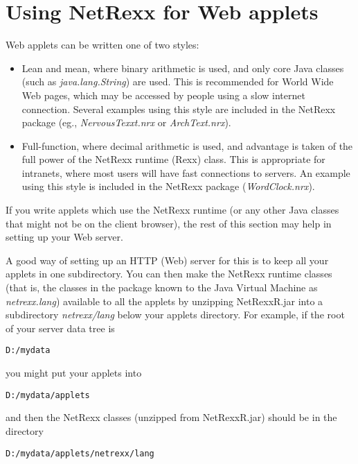 \chapter{Using NetRexx for Web applets}

Web applets can be written one of two styles:
\begin{itemize}
\item Lean and mean, where binary arithmetic is used, and only core
Java classes (such as \emph{java.lang.String}) are used.  This is
recommended for World Wide Web pages, which may be accessed by people
using a slow internet connection.
Several examples using this style are included in the NetRexx package
(eg., \emph{NervousTexxt.nrx} or \emph{ArchText.nrx}).
\item Full-function, where decimal arithmetic is used, and advantage is
taken of the full power of the NetRexx runtime (Rexx) class.
This is appropriate for intranets, where most users will have fast
connections to servers.
An example using this style is included in the NetRexx package
(\emph{WordClock.nrx}).
\end{itemize}
If you write applets which use the NetRexx runtime (or any other Java
classes that might not be on the client browser), the rest of this
section may help in setting up your Web server.

A good way of setting up an HTTP (Web) server for this is to keep all
your applets in one subdirectory.  You can then make the NetRexx runtime
classes (that is, the classes in the package known to the Java Virtual
Machine as \emph{netrexx.lang}) available to all the applets by
unzipping NetRexxR.jar into a subdirectory \emph{netrexx/lang} below
your applets directory.
\newline
For example, if the root of your server data tree is
\begin{verbatim}
D:/mydata
\end{verbatim}
 you might put your applets into
\begin{verbatim}
D:/mydata/applets
\end{verbatim}
and then the NetRexx classes (unzipped from NetRexxR.jar) should be in
the directory
\begin{verbatim}
D:/mydata/applets/netrexx/lang
\end{verbatim}

